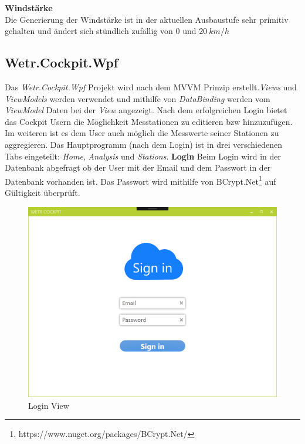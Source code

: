 \textbf{Windstärke}\\
Die Generierung der Windstärke ist in der aktuellen Ausbaustufe sehr primitiv gehalten und ändert sich stündlich zufällig von $0$ und $20\ km/h$


\newpage
\subsection{Wetr.Cockpit.Wpf}
Das \textit{Wetr.Cockpit.Wpf} Projekt wird nach dem MVVM Prinzip erstellt.\textit{Views} und \textit{ViewModels} werden verwendet und mithilfe von \textit{DataBinding} werden vom \textit{ViewModel} Daten bei der \textit{View} angezeigt. Nach dem erfolgreichen Login bietet das Cockpit Usern die Möglichkeit Messtationen zu editieren bzw hinzuzufügen. Im weiteren ist es dem User auch möglich die Messwerte seiner Stationen zu aggregieren.
\newline
\newline
Das Hauptprogramm (nach dem Login) ist in drei verschiedenen Tabs eingeteilt: \newline\textit{Home}, \textit{Analysis} und \textit{Stations}.
\newline
\newline
\textbf{Login}\newline
Beim Login wird in der Datenbank abgefragt ob der User mit der Email und dem Passwort in der Datenbank vorhanden ist. Das Passwort wird mithilfe von BCrypt.Net\footnote{https://www.nuget.org/packages/BCrypt.Net/} auf Gültigkeit überprüft.

\begin{figure}[H]
\centering
\includegraphics[width=.7\textwidth]{pictures/Cockpit/Cockpit_1.png}
\caption{Login View}
\label{fig:Wetr.Cockpit.Wpf.LoginView}
\end{figure}
\raggedright

